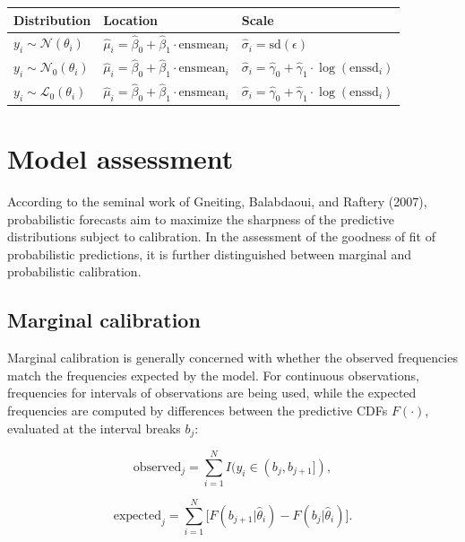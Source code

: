 \documentclass[twoside]{report}
\begin{document}
\begin{table}[!ht]\centering
    \begin{tabular}{lll}
         Distribution                              & Location                                         & Scale \\
        \midrule[0.09 em]
        $y_i \sim \mathcal{N}(\theta_i)$   & $\hat{\mu}_i = \hat{\beta}_0 + \hat{\beta}_1 \cdot \text{ensmean}_i$ & $\hat{\sigma}_i = \text{sd}(\epsilon)$ \\
        $y_i \sim \mathcal{N}_0(\theta_i)$ & $\hat{\mu}_i = \hat{\beta}_0 + \hat{\beta}_1 \cdot \text{ensmean}_i$ & $\hat{\sigma}_i = \hat{\gamma}_0 + \hat{\gamma}_1 \cdot \log(\text{enssd}_i)$ \\
        $y_i \sim \mathcal{L}_0(\theta_i)$ & $\hat{\mu}_i = \hat{\beta}_0 + \hat{\beta}_1 \cdot \text{ensmean}_i$ & $\hat{\sigma}_i = \hat{\gamma}_0 + \hat{\gamma}_1 \cdot \log(\text{enssd}_i)$ \\
        \bottomrule[0.09 em]
    \end{tabular}
\end{table}


\section{Model assessment}

According to the seminal work of Gneiting, Balabdaoui, and Raftery (2007),
probabilistic forecasts aim to maximize the sharpness of the predictive
distributions subject to calibration. 
In the assessment of the goodness of fit of probabilistic predictions,
it is further distinguished between marginal and probabilistic calibration.

\subsection{Marginal calibration}

Marginal calibration is generally concerned with whether the observed
frequencies match the frequencies expected by the model.  For continuous
observations, frequencies for intervals of observations are being used, while
the expected frequencies are computed by differences between the predictive
CDFs $F(\cdot)$, evaluated at the interval breaks $b_j$:

$$
\text{observed}_j = \sum_{i=1}^N I(y_i \in (b_j, b_{j+1}]),
$$

$$
\text{expected}_j = \sum_{i=1}^N \big[ F(b_{j+1} | \hat{\theta}_i) - F(b_{j} | \hat{\theta}_i) \big].
$$
\end{document}
